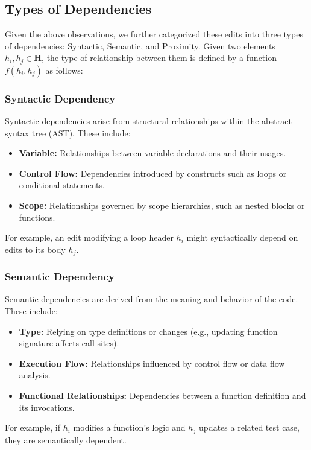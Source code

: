 
\subsection{Types of Dependencies}

Given the above observations, we further categorized these edits into three types of dependencies: Syntactic, Semantic, and Proximity. Given two elements \( h_i, h_j \in \mathbf{H} \), the type of relationship between them is defined by a function \( f(h_i, h_j) \) as follows:

\subsubsection{Syntactic Dependency}
Syntactic dependencies arise from structural relationships within the abstract syntax tree (AST). These include:
\begin{itemize}
    \item \textbf{Variable:} Relationships between variable declarations and their usages.
    \item \textbf{Control Flow:} Dependencies introduced by constructs such as loops or conditional statements.
    \item \textbf{Scope:} Relationships governed by scope hierarchies, such as nested blocks or functions.
\end{itemize}
For example, an edit modifying a loop header \( h_i \) might syntactically depend on edits to its body \( h_j \).

\subsubsection{Semantic Dependency}
Semantic dependencies are derived from the meaning and behavior of the code. These include:
\begin{itemize}
    \item \textbf{Type:} Relying on type definitions or changes (e.g., updating function signature affects call sites).
    \item \textbf{Execution Flow:} Relationships influenced by control flow or data flow analysis.
    \item \textbf{Functional Relationships:} Dependencies between a function definition and its invocations.
\end{itemize}
For example, if \( h_i \) modifies a function’s logic and \( h_j \) updates a related test case, they are semantically dependent.

